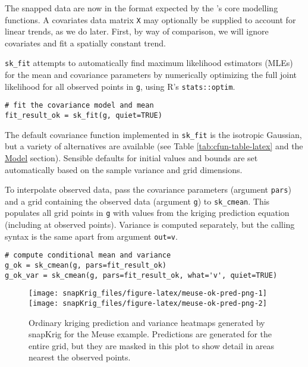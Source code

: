The snapped data are now in the format expected by the 's core modelling functions. A covariates data matrix \texttt{X} may optionally be supplied to account for linear trends, as we do later. First, by way of comparison, we will ignore covariates and fit a spatially constant trend.

\texttt{sk\_fit} attempts to automatically find maximum likelihood estimators (MLEs) for the mean and covariance parameters by numerically optimizing the full joint likelihood for all observed points in \texttt{g}, using R's \texttt{stats::optim}.

\begin{verbatim}
# fit the covariance model and mean
fit_result_ok = sk_fit(g, quiet=TRUE)
\end{verbatim}

The default covariance function implemented in \texttt{sk\_fit} is the isotropic Gaussian, but a variety of alternatives are available
(see Table \ref{tab:cfun-table-latex} and the \protect\hyperlink{model}{Model} section). Sensible defaults for initial values and bounds are set automatically based on the sample variance and grid dimensions.

To interpolate observed data, pass the covariance parameters (argument \texttt{pars}) and a grid containing the observed data (argument \texttt{g}) to \texttt{sk\_cmean}. This populates all grid points in \texttt{g} with values from the kriging prediction equation (including at observed points). Variance is computed separately, but the calling syntax is the same apart from argument \texttt{out=\textquotesingle{}v\textquotesingle{}}.

\begin{verbatim}
# compute conditional mean and variance 
g_ok = sk_cmean(g, pars=fit_result_ok)
g_ok_var = sk_cmean(g, pars=fit_result_ok, what='v', quiet=TRUE)
\end{verbatim}

\begin{figure}
\texttt{[image: snapKrig\_files/figure-latex/meuse-ok-pred-png-1]} \texttt{[image: snapKrig\_files/figure-latex/meuse-ok-pred-png-2]} \caption{Ordinary kriging prediction and variance heatmaps generated by snapKrig for the Meuse example. Predictions are generated for the entire grid, but they are masked in this plot to show detail in areas nearest the observed points.}\label{fig:meuse-ok-pred-png}
\end{figure}

